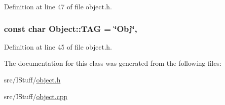 Definition at line 47 of file object.\-h.

\hypertarget{class_i_stuff_1_1_object_a2ba8d34aa857298238f9800e1f3ddb1e}{
\subsubsection[{T\-A\-G}]{\setlength{\rightskip}{0pt plus 5cm}const char Object\-::\-T\-A\-G = \char`\"{}Obj\char`\"{}\hspace{0.3cm}{\ttfamily [static]}, {\ttfamily [private]}}}\label{class_i_stuff_1_1_object_a2ba8d34aa857298238f9800e1f3ddb1e}


Definition at line 45 of file object.\-h.



The documentation for this class was generated from the following files\-:\begin{DoxyCompactItemize}
\item 
src/\-I\-Stuff/\hyperlink{object_8h}{object.\-h}\item 
src/\-I\-Stuff/\hyperlink{object_8cpp}{object.\-cpp}\end{DoxyCompactItemize}
